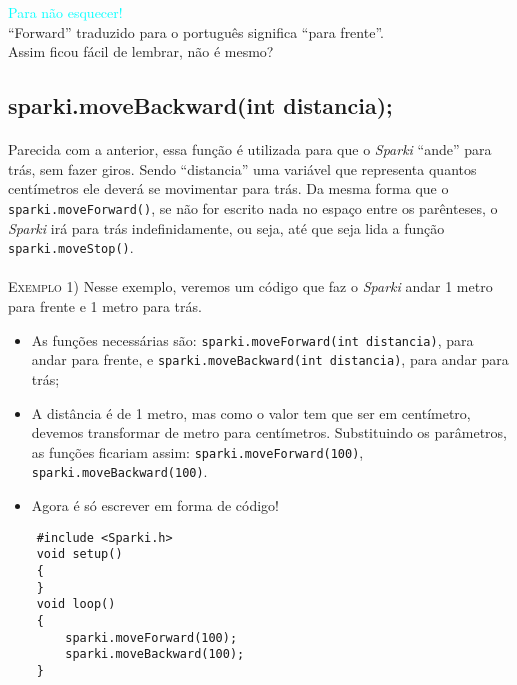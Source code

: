     \begin{center}
    \textcolor{cyan}{Para não esquecer!} \\``Forward'' traduzido para o português significa ``para frente''. 
    \\Assim ficou fácil de lembrar, não é mesmo?
    \end{center}

\subsection{sparki.moveBackward(int distancia);}
    \paragraph{}
    Parecida com a anterior, essa função é utilizada para que o \textsl{Sparki} ``ande'' para trás, sem fazer giros. Sendo ``distancia'' uma variável que representa quantos centímetros ele deverá se movimentar para trás. Da mesma forma que o \texttt{sparki.moveForward()}, se não for escrito nada no espaço entre os parênteses, o \textsl{Sparki} irá para trás indefinidamente, ou seja, até que seja lida a função \texttt{sparki.moveStop()}.
    \\~\\
    
    \textsc{Exemplo 1)} Nesse exemplo, veremos um código que faz o \textsl{Sparki} andar 1 metro para frente e 1 metro para trás.
    
    \begin{itemize}
        \item As funções necessárias são: \texttt{sparki.moveForward(int distancia)}, para andar para frente, e \texttt{sparki.moveBackward(int distancia)}, para andar para trás;
        \item A distância é de 1 metro, mas como o valor tem que ser em centímetro, devemos transformar de metro para centímetros. Substituindo os parâmetros, as funções ficariam assim: \texttt{sparki.moveForward(100)}, \texttt{sparki.moveBackward(100)}.
        \item Agora é só escrever em forma de código!
    \end{itemize}
    
    \begin{verbatim}
    #include <Sparki.h>
    void setup()
    {
    }
    void loop()
    {
        sparki.moveForward(100);
        sparki.moveBackward(100);
    }
    \end{verbatim}
    
